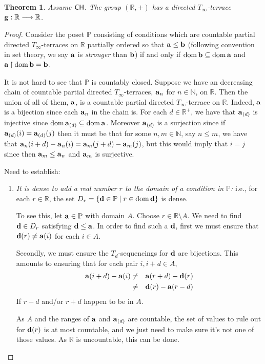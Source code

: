 \documentclass[11pt]{amsart}
\newtheorem{theorem}{Theorem}
\theoremstyle{definition}
\theoremstyle{remark}
\renewcommand{\P}{\mathbb{P}}
\newcommand{\N}{\mathbb{N}}
\newcommand{\R}{\mathbb{R}}
\newcommand{\CH}{\textup{\textsf{CH}}}
\DeclareMathOperator{\dom}{dom}
\newcommand{\st}{\; | \;}
\newcommand{\set}[2]{\left\{#1\st #2 \right\}}
\newcommand{\rest}{\mathbin{\upharpoonright}}
\newcommand{\To}{\longrightarrow}
\renewcommand{\a}{\textup{\textbf{a}}}
\renewcommand{\b}{\textup{\textbf{b}}}
\newcommand{\g}{\textup{\textbf{g}}}
\renewcommand{\d}{\textup{\textbf{d}}}
\begin{document}
\begin{theorem}
Assume $\CH$. The group $(\R, +)$ has a directed $T_\infty$-terrace $\g: \R \To \R$. 
\end{theorem}
\begin{proof}
Consider the poset $\P$ consisting of conditions which are countable partial directed $T_\infty$-terraces on $\R$ partially ordered so that $\a \leq \b$ (following convention in set theory, we say $\a$ is \emph{stronger} than $\b$) if and only if $\dom \b \subseteq \dom \a$ and $\a \rest \dom \b = \b$.

It is not hard to see that $\P$ is countably closed. Suppose we have an decreasing chain of countable partial directed $T_\infty$-terraces, $\a_n$ for $n \in \N$, on $\R$. Then the union of all of them, $\a$, is a countable partial directed $T_\infty$-terrace on $\R$. Indeed, $\a$ is a bijection since each $\a_n$ in the chain is. For each $d \in \R^+$, we have that $\a_{(d)}$ is injective since $\dom\a_{(d)} \subseteq \dom\a$. Moreover $\a_{(d)}$ is a surjection since if $\a_{(d)}(i)=\a_{(d)}(j)$ then it must be that for some $n,m \in \N$, say $n\leq m$, we have that $\a_n(i+d)-\a_n(i)=\a_m(j+d)-\a_m(j)$, but this would imply that $i=j$ since then $\a_m \leq \a_n$ and $\a_m$ is surjective.

Need to establish: \begin{enumerate}

	\item \label{item:DomainDense} \emph{It is dense to add a real number $r$ to the domain of a condition in $\P$:} i.e., for each $r \in \R$, the set $D_r=\set{\d \in \P}{r \in \dom \d }$ is dense. 
	
	To see this, let $\a \in \P$ with domain $A$. Choose $r \in \R \setminus A$. We need to find $\d \in D_r$ satisfying $\d \leq \a$. In order to find such a $\d$, first we must ensure that $\d(r) \neq \a(i)$ for each $i \in A$. 
	
	Secondly, we must ensure the $T_d$-sequencings for $\d$ are bijections. This amounts to ensuring that for each pair $i, i+d \in A$, 
	\begin{eqnarray*}
		\a(i+d)-\a(i) &\neq& \a(r+d)-\d(r) \\
					&\neq& \d(r)-\a(r-d)
	\end{eqnarray*}				
	If $r-d$ and/or $r+d$ happen to be in $A$. 
	
	As $A$ and the ranges of $\a$ and $\a_{(d)}$ are countable, the set of values to rule out for $\d(r)$ is at most countable, and we just need to make sure it's not one of those values. As $\R$ is uncountable, this can be done. \\
	

\end{enumerate}
\end{proof}
\end{document}
